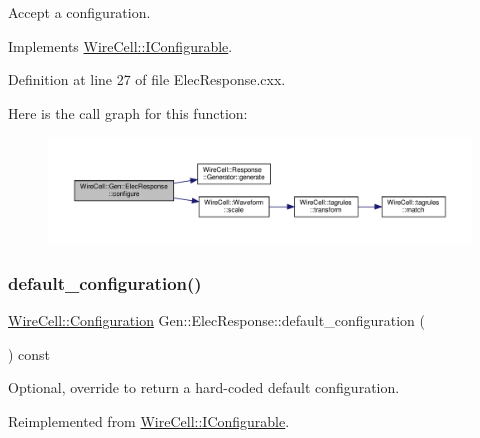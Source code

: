 Accept a configuration. 



Implements \hyperlink{class_wire_cell_1_1_i_configurable_a57ff687923a724093df3de59c6ff237d}{Wire\+Cell\+::\+I\+Configurable}.



Definition at line 27 of file Elec\+Response.\+cxx.

Here is the call graph for this function\+:
\nopagebreak
\begin{figure}[H]
\begin{center}
\leavevmode
\includegraphics[width=350pt]{class_wire_cell_1_1_gen_1_1_elec_response_aefafca51074d60af586f6cf90599634c_cgraph}
\end{center}
\end{figure}
\mbox{\label{class_wire_cell_1_1_gen_1_1_elec_response_a9b471a619f030a48ff0e5ccec6dca34d}} 
\subsubsection{\texorpdfstring{default\+\_\+configuration()}{default\_configuration()}}
{\footnotesize\ttfamily \hyperlink{namespace_wire_cell_a9f705541fc1d46c608b3d32c182333ee}{Wire\+Cell\+::\+Configuration} Gen\+::\+Elec\+Response\+::default\+\_\+configuration (\begin{DoxyParamCaption}{ }\end{DoxyParamCaption}) const\hspace{0.3cm}{\ttfamily [virtual]}}



Optional, override to return a hard-\/coded default configuration. 



Reimplemented from \hyperlink{class_wire_cell_1_1_i_configurable_a54841b2da3d1ea02189478bff96f7998}{Wire\+Cell\+::\+I\+Configurable}.



